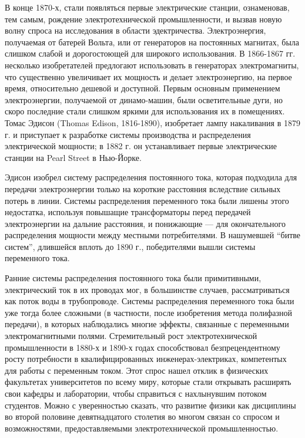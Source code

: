\documentclass[12pt, oneside, a4paper]{article}
\begin{document}
В конце 1870-х, стали появляться первые электрические станции, ознаменовав, тем самым, рождение электротехнической промышленности, и вызвав новую волну спроса на исследования в области эдектричества. Электроэнергия, получаемая от батерей Вольта, или от генераторов на постоянных магнитах, была слишком слабой и дорогостоющей для широкого использования. В 1866-1867 гг. несколько изобретателей предлогают использовать в генераторах электромагниты, что существенно увеличивает их мощность и делает электроэнергию, на первое время, относительно дешевой и доступной. Первым основным применением электроэнергии, получаемой от динамо-машин, были осветительные дуги, но скоро последние стали слишком яркими для использования их в помещениях. Томас Эдисон (Thomas Edison, 1816-1890), изобретает лампу накаливания в 1879 г. и приступает к разработке системы производства и распределения электрической мощности; в 1882 г. он устанавливает первые электрические станции на Pearl Street в Нью-Йорке.

Эдисон изобрел систему распределения постоянного тока, которая подходила для передачи электроэнергии только на короткие расстояния вследствие сильных потерь в линии. Системы распределения переменного тока были лишены этого недостатка, используя повышащие трансформаторы перед передачей электроэнергии на дальние расстояния, и понижающие --- для окончательного распределения мощности между местными потребителями. В нашумевшей ``битве систем'', длившейся вплоть до 1890 г., победителями вышли системы переменного тока.

Ранние системы распределения постоянного тока были примитивными, электрический ток в их проводах мог, в большинстве случаев, рассматриваться как поток воды в трубопроводе. Системы распределения переменного тока были уже тогда более сложными (в частности, после изобретения метода полифазной передачи), в которых наблюдались многие эффекты, связанные с переменными электромагнитными полями. Стремительный рост электротехнической промышленности в 1880-х и 1890-х годах способствовал безпрецендентному росту потребности в квалифицированных инженерах-электриках, компетентых для работы с переменным током. Этот спрос нашел отклик в физических факультетах университетов по всему миру, которые стали открывать расширять свои кафедры и лаборатории, чтобы справиться с нахлынувшим потоком студентов. Можно с уверенностью сказать, что развитие физики как дисциплины во второй половине девятнадцатого столетия во многом связан со спросом и возможностями, предоставляемыми электротехнической промышленностью. 
\end{document}
